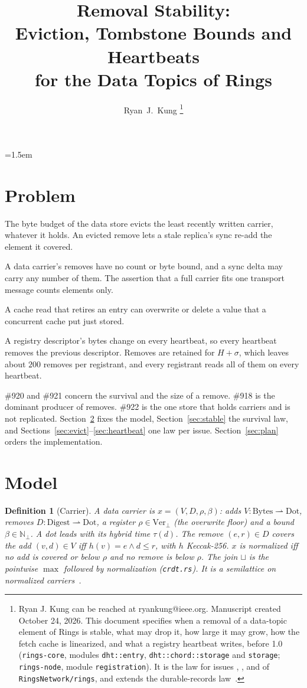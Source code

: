 \documentclass[journal]{IEEEtran}
\author{Ryan~J.~Kung%
\thanks{Ryan J. Kung can be reached at ryankung@ieee.org.
Manuscript created October 24, 2026.  This document specifies when a removal of a data-topic
element of Rings is stable, what may drop it, how large it may grow, how the fetch cache is
linearized, and what a registry heartbeat writes, before 1.0 (\texttt{rings-core}, modules
\texttt{dht::entry}, \texttt{dht::chord::storage} and \texttt{storage}; \texttt{rings-node},
module \texttt{registration}).  It is the law for issues \issue{918}, \issue{920},
\issue{921} and \issue{922} of \texttt{RingsNetwork/rings}, and extends the durable-records
law~\cite{DurableRecords}.}}
\title{\huge Removal Stability:\\
Eviction, Tombstone Bounds and Heartbeats\\
for the Data Topics of Rings}
\date{}
\newtheorem{definition}{Definition}
\newcommand{\dg}{h}
\newcommand{\issue}[1]{\#{#1}}
\begin{document}
\maketitle
\emergencystretch=1.5em

\section{Problem}\label{sec:problem}

\begin{description}[leftmargin=1.2em,style=nextline]
\item[\issue{920}] The byte budget of the data store evicts the least recently written
carrier, whatever it holds.  An evicted remove lets a stale replica's sync re-add the element
it covered.
\item[\issue{921}] A data carrier's removes have no count or byte bound, and a sync delta
may carry any number of them.  The assertion that a full carrier fits one transport message
counts elements only.
\item[\issue{922}] A cache read that retires an entry can overwrite or delete a value that a
concurrent cache put just stored.
\item[\issue{918}] A registry descriptor's bytes change on every heartbeat, so every
heartbeat removes the previous descriptor.  Removes are retained for $H+\sigma$, which leaves
about $200$ removes per registrant, and every registrant reads all of them on every heartbeat.
\end{description}
\issue{920} and \issue{921} concern the survival and the size of a remove.  \issue{918} is
the dominant producer of removes.  \issue{922} is the one store that holds carriers and is
not replicated.  Section~\ref{sec:model} fixes the model, Section~\ref{sec:stable} the
survival law, and Sections~\ref{sec:evict}--\ref{sec:heartbeat} one law per issue.
Section~\ref{sec:plan} orders the implementation.

\section{Model}\label{sec:model}

\begin{definition}[Carrier]\label{def:carrier}
A data carrier is $x=(V,D,\rho,\beta)$: adds $V:\mathrm{Bytes}\rightharpoonup\mathrm{Dot}$,
removes $D:\mathrm{Digest}\rightharpoonup\mathrm{Dot}$, a register
$\rho\in\mathrm{Ver}_\bot$ (the overwrite floor) and a bound $\beta\in\mathbb{N}_\bot$.  A dot
leads with its hybrid time $\tau(d)$.  The remove $(e,r)\in D$ \emph{covers} the add
$(v,d)\in V$ iff $\dg(v)=e\wedge d\le r$, with $\dg$ Keccak-256.  $x$ is \emph{normalized}
iff no add is covered or below $\rho$ and no remove is below $\rho$.  The join $\sqcup$ is
the pointwise $\max$ followed by normalization (\texttt{crdt.rs}).  It is a semilattice on
normalized carriers~\cite{Shapiro2011}.
\end{definition}
\end{document}
